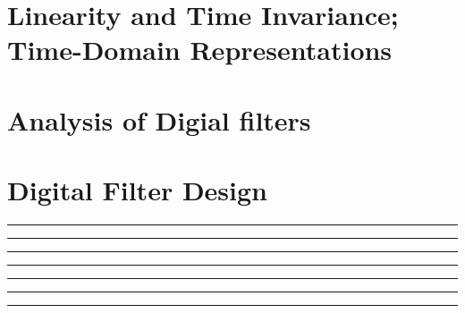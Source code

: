 \documentclass[10pt]{article}
\begin{document}
\newcommand{\josquote}[1]{
    \framebox{
    \parbox{\textwidth}{
    \textit{#1}
    }
    }
}

\newcommand{\paulhint}[1]{
    #1
}

\setlength\parindent{0pt}
\section{Linearity and Time Invariance; Time-Domain Representations}
%
%
%
%
%
\section{Analysis of Digial filters}
%
%
%
%
%
\section{Digital Filter Design}
%
%
%
%
%
%

\noindent\rule[0.5ex]{\linewidth}{0.5pt}

\noindent\rule[0.5ex]{\linewidth}{0.5pt}

\noindent\rule[0.5ex]{\linewidth}{0.5pt}

\noindent\rule[0.5ex]{\linewidth}{0.5pt}

\noindent\rule[0.5ex]{\linewidth}{0.5pt}

\noindent\rule[0.5ex]{\linewidth}{0.5pt}

\noindent\rule[0.5ex]{\linewidth}{0.5pt}

\end{document}
